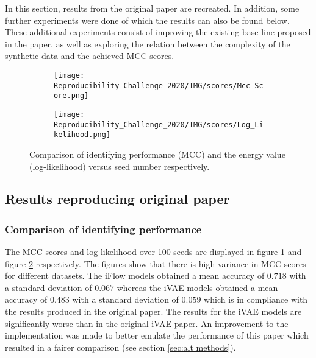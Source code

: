 In this section, results from the original paper are recreated. In addition, some further experiments were done of which the results can also be found below. These additional experiments consist of improving the existing base line proposed in the paper, as well as exploring the relation between the complexity of the synthetic data and the achieved MCC scores.

\begin{figure}[ht]
  \begin{subfigure}[b]{0.5\textwidth}
    \centering
    \texttt{[image: Reproducibility\_Challenge\_2020/IMG/scores/Mcc\_Score.png]}
    \caption{}
    \label{fig:MCCscores:a}
  \end{subfigure}%
  \begin{subfigure}[b]{0.5\textwidth}
    \centering
    \texttt{[image: Reproducibility\_Challenge\_2020/IMG/scores/Log\_Likelihood.png]}
    \caption{}
    \label{fig:MCCscores:b}
  \end{subfigure}
  \caption{Comparison of identifying performance (MCC) and the energy value (log-likelihood) versus seed number respectively.}
  \label{fig:MCCscores}
\end{figure}

\subsection{Results reproducing original paper}

\subsubsection{Comparison of identifying performance}
The MCC scores and log-likelihood over 100 seeds are displayed in figure \ref{fig:MCCscores:a} and figure \ref{fig:MCCscores:b} respectively. The figures show that there is high variance in MCC scores for different datasets. The iFlow models obtained a mean accuracy of $0.718$ with a standard deviation of $0.067$ whereas the iVAE models obtained a mean accuracy of $0.483$ with a standard deviation of $0.059$ which is in compliance with the results produced in the original paper. The results for the iVAE models are significantly worse than in the original iVAE paper. An improvement to the implementation was made to better emulate the performance of this paper which resulted in a fairer comparison (see section \ref{sec:alt methods}).

